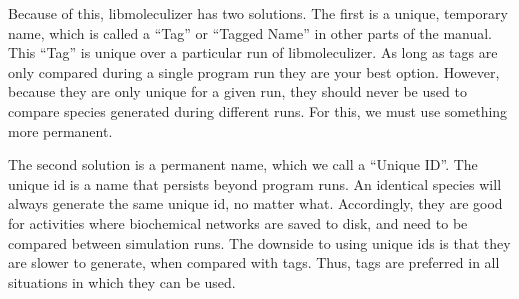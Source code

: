 Because of this, libmoleculizer has two solutions.  The first is a
unique, temporary name, which is called a ``Tag'' or ``Tagged Name''
in other parts of the manual.  This ``Tag'' is unique over a
particular run of libmoleculizer.  As long as tags are only compared
during a single program run they are your best option. However,
because they are only unique for a given run, they should never be
used to compare species generated during different runs.  For this, we
must use something more permanent.  

The second solution is a permanent name, which we call a ``Unique
ID''.  The unique id is a name that persists beyond program runs.  An
identical species will always generate the same unique id, no matter
what.  Accordingly, they are good for activities where biochemical
networks are saved to disk, and need to be compared between simulation
runs.  The downside to using unique ids is that they are slower to
generate, when compared with tags.  Thus, tags are preferred in all
situations in which they can be used.
